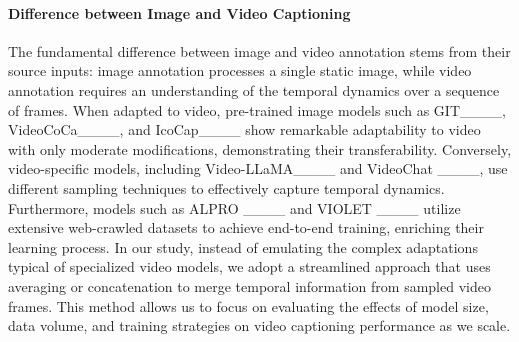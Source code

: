 \paragraph{Difference between Image and Video Captioning}
The fundamental difference between image and video annotation stems from their source inputs: image annotation processes a single static image, while video annotation requires an understanding of the temporal dynamics over a sequence of frames. When adapted to video, pre-trained image models such as GIT____, VideoCoCa____, and IcoCap____ show remarkable adaptability to video with only moderate modifications, demonstrating their transferability. Conversely, video-specific models, including Video-LLaMA____ and VideoChat ____, use different sampling techniques to effectively capture temporal dynamics. Furthermore, models such as ALPRO ____ and VIOLET ____ utilize extensive web-crawled datasets to achieve end-to-end training, enriching their learning process. In our study, instead of emulating the complex adaptations typical of specialized video models, we adopt a streamlined approach that uses averaging or concatenation to merge temporal information from sampled video frames. This method allows us to focus on evaluating the effects of model size, data volume, and training strategies on video captioning performance as we scale.